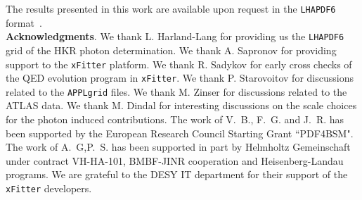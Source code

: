 The results presented in this work are available upon
request in the {\tt LHAPDF6} format~\cite{Buckley:2014ana}.\\

{\bf Acknowledgments}.
%
We thank L. Harland-Lang for providing us the {\tt LHAPDF6} grid of
the HKR photon determination.
%
We thank A. Sapronov for providing support to the {\tt xFitter} platform.
%
We thank R. Sadykov for early cross checks of the QED evolution program in {\tt xFitter}.
%
We thank P. Starovoitov for discussions related to the {\tt APPLgrid} files.
%
We thank M. Zinser for discussions related to the ATLAS data.
% 
We thank M. Dindal for interesting discussions on the scale choices for the photon induced contributions.
%
The work of V.~B., F.~G. and J.~R. has been supported by the European
Research Council Starting Grant ``PDF4BSM".
%
The work of A.~G,P.~S. has been supported in part by Helmholtz Gemeinschaft
under contract VH-HA-101, BMBF-JINR cooperation and Heisenberg-Landau programs.
%
We are grateful to the DESY IT department for their support of the {\tt xFitter} developers. 



